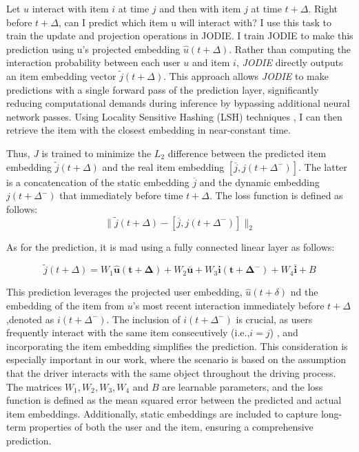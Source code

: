 Let $u$ interact with item $i$ at time $j$ and then with item $j$ at time $t + \Delta$. Right before $t + \Delta$, can I predict which item u will interact with? I use this task to train the update and projection operations in JODIE. I train JODIE to make this prediction using u’s projected embedding $ \hat{u}(t+ \Delta)$. Rather than computing the interaction probability between each user $u$ and item $i$, \textit{JODIE} directly outputs an item embedding vector $\tilde{j}(t + \Delta)$. This approach allows \textit{JODIE} to make predictions with a single forward pass of the prediction layer, significantly reducing computational demands during inference by bypassing additional neural network passes. Using Locality Sensitive Hashing (LSH) techniques \cite{rajaraman2011mining}, I can then retrieve the item with the closest embedding in near-constant time.

Thus, \textit{J} is trained to minimize the $L_2$ difference between the predicted item embedding $\tilde{j}(t + \Delta)$ and the real item embedding $[\overline{j}, j(t + \Delta^-)]$. The latter is a concatencation of the static embedding $\overline{j}$ and the dynamic embedding $j(t + \Delta^-)$ that immediately before time $t+\Delta$. The loss function is defined as follows:
\[ \| \tilde{j}(t + \Delta) - [\overline{j}, j(t + \Delta^-)] \|_2 \]

As for the prediction, it is mad using a fully connected linear layer as follows:

\[\tilde{j}(t+\Delta)=W_1\mathbf{\hat{u}(t+\Delta)}+W_2\mathbf{\bar{u}}+W_3\mathbf{i(t+\Delta ^-)}+W_4\mathbf{\bar{i}}+B\]

This prediction leverages the projected user embedding, $\hat{u}(t+\delta)$ nd the embedding of the item from $u$'s most recent interaction immediately before $t+\Delta$,denoted as $i(t+\Delta ^-)$. The inclusion of $i(t+\Delta ^-)$ is crucial, as users frequently interact with the same item consecutively (i.e.,$i=j$) , and incorporating the item embedding simplifies the prediction. This consideration is especially important in our work, where the scenario is based on the assumption that the driver interacts with the same object throughout the driving process. The matrices $W_1,W_2,W_3,W_4$ and $B$ are learnable parameters, and the loss function is defined as the mean squared error between the predicted and actual item embeddings. Additionally, static embeddings are included to capture long-term properties of both the user and the item, ensuring a comprehensive prediction.

